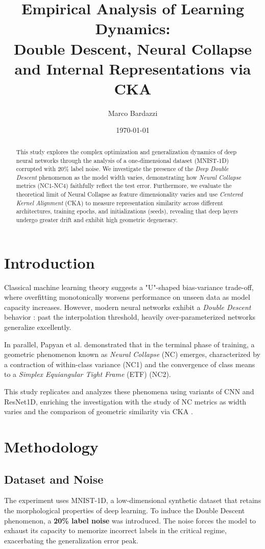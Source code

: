 \documentclass[10pt,twocolumn,letterpaper]{article}
\title{\Large \bf Empirical Analysis of Learning Dynamics: \\ Double Descent, Neural Collapse and Internal Representations via CKA}
\author{Marco Bardazzi}
\date{\today}
\begin{document}
\maketitle

\begin{abstract}
This study explores the complex optimization and generalization dynamics of deep neural networks through the analysis of a one-dimensional dataset (MNIST-1D) corrupted with 20\% label noise. We investigate the presence of the \textit{Deep Double Descent} phenomenon as the model width varies, demonstrating how \textit{Neural Collapse} metrics (NC1-NC4) faithfully reflect the test error. Furthermore, we evaluate the theoretical limit of Neural Collapse as feature dimensionality varies and use \textit{Centered Kernel Alignment} (CKA) to measure representation similarity across different architectures, training epochs, and initializations (seeds), revealing that deep layers undergo greater drift and exhibit high geometric degeneracy.
\end{abstract}

\section{Introduction}
Classical machine learning theory suggests a "U"-shaped bias-variance trade-off, where overfitting monotonically worsens performance on unseen data as model capacity increases. However, modern neural networks exhibit a \textit{Double Descent} behavior \cite{belkin2019}: past the interpolation threshold, heavily over-parameterized networks generalize excellently. 

In parallel, Papyan et al. \cite{papyan2020} demonstrated that in the terminal phase of training, a geometric phenomenon known as \textit{Neural Collapse} (NC) emerges, characterized by a contraction of within-class variance (NC1) and the convergence of class means to a \textit{Simplex Equiangular Tight Frame} (ETF) (NC2). 

This study replicates and analyzes these phenomena using variants of CNN and ResNet1D, enriching the investigation with the study of NC metrics as width varies and the comparison of geometric similarity via CKA \cite{kornblith2019}.

\section{Methodology}

\subsection{Dataset and Noise}
The experiment uses MNIST-1D, a low-dimensional synthetic dataset that retains the morphological properties of deep learning. To induce the Double Descent phenomenon, a \textbf{20\% label noise} was introduced. The noise forces the model to exhaust its capacity to memorize incorrect labels in the critical regime, exacerbating the generalization error peak.
\end{document}
